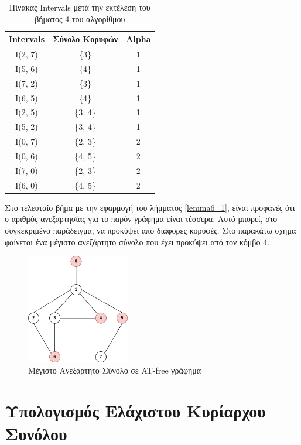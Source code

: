 \begin{table}[H]
	\centering
	\caption{Πίνακας Intervals μετά την εκτέλεση του βήματος 4 του αλγορίθμου}
	\begin{tabular}{|c|c|c|}
		\hline
		\textbf{Intervals} & \textbf{Σύνολο Κορυφών} & \textbf{Alpha} \\
		\hline
		I(2, 7) & \{3\} & 1 \\
		I(5, 6) & \{4\} & 1 \\
		I(7, 2) & \{3\} & 1 \\
		I(6, 5) & \{4\} & 1 \\
		I(2, 5) & \{3, 4\} & 1 \\
		I(5, 2) & \{3, 4\} & 1 \\
		I(0, 7) & \{2, 3\} & 2 \\
		I(0, 6) & \{4, 5\} & 2 \\
		I(7, 0) & \{2, 3\} & 2 \\
		I(6, 0) & \{4, 5\} & 2 \\
		\hline
	\end{tabular}
	\label{table:computed-alpha-intervals}
\end{table}

Στο τελευταίο βήμα με την εφαρμογή του λήμματος \ref{lemma6_1}, είναι προφανές ότι ο αριθμός ανεξαρτησίας για το παρόν γράφημα είναι τέσσερα. Αυτό μπορεί, στο συγκεκριμένο παράδειγμα, να προκύψει από διάφορες κορυφές. Στο παρακάτω  σχήμα φαίνεται ένα μέγιστο ανεξάρτητο σύνολο που έχει προκύψει από τον κόμβο $4$.


\begin{figure}[H]
	\centering
	\includegraphics[width=0.4\textwidth]{pictures/at-free-graph.intependent-set.png} 
	\caption{Μέγιστο Ανεξάρτητο Σύνολο σε AT-free γράφημα}
	\label{fig:at-free-graph-independent-set}
\end{figure}


\section{Υπολογισμός Ελάχιστου Κυρίαρχου Συνόλου}
\label{sec:Domination_Set_Alg}

